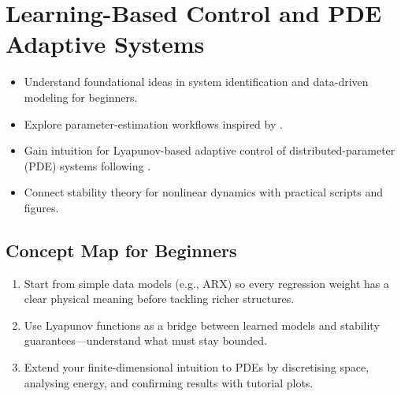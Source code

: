 \chapter{Learning-Based Control and PDE Adaptive Systems}
\label{chap:learning}

\begin{learningobjective}
\begin{itemize}[leftmargin=*]
    \item Understand foundational ideas in system identification and data-driven modeling for beginners.
    \item Explore parameter-estimation workflows inspired by \textcite{ljung2012control,astrom1995pid}.
    \item Gain intuition for Lyapunov-based adaptive control of distributed-parameter (PDE) systems following \textcite{krstic1995nonlinear}.
    \item Connect stability theory for nonlinear dynamics with practical scripts and figures.
\end{itemize}
\end{learningobjective}

\section{Concept Map for Beginners}
\begin{conceptroadmap}
\begin{enumerate}[leftmargin=*]
    \item Start from simple data models (e.g., ARX) so every regression weight has a clear physical meaning before tackling richer structures.
    \item Use Lyapunov functions as a bridge between learned models and stability guarantees—understand what must stay bounded.
    \item Extend your finite-dimensional intuition to PDEs by discretising space, analysing energy, and confirming results with tutorial plots.
\end{enumerate}
\end{conceptroadmap}

